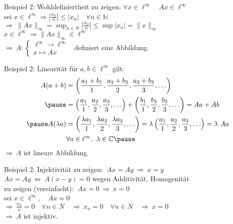 \documentclass[AERbeamer%
,optBeamerClassicFormat%
,optLeftEquations   %
]{AERlatex}
\begin{document}
%
    \begin{frame}{Beispiel 2: Wohldefiniertheit}
        \setlength{\baselineskip}{1.6\baselineskip}
        zu zeigen: $\forall x \in \ell^{\infty} \quad A x \in \ell^{\infty}$ \\ \pause
        sei $x \in \ell^{\infty} \Rightarrow\left|\frac{x_n}{n}\right| \leq\left|x_n\right| \quad \forall n \in \mathbb{N}$ \\ \pause
        $\Rightarrow ~ \|A x\|_{\infty}=\sup _{n \in N}\left|\frac{x_n}{n}\right| \leq \sup \left|x_n\right|=\|x\|_{\infty}$ \\ \pause
        $x \in \ell^{\infty} \Rightarrow\|A x\|_{\infty} \in \ell^{\infty}$ \\ \pause
        \vspace{1em}
        $\Rightarrow ~ A:\left\{\begin{array}{l}
                                    \ell^{\infty} \rightarrow \ell^{\infty} \\ x \mapsto A x
        \end{array} \right.~$ definiert eine Abbildung.
    \end{frame}
%
    \begin{frame}{Beispiel 2: Linearität}
        \setlength{\baselineskip}{1.6\baselineskip}
        für $a, b \in \ell^{\infty}$ gilt:
        \begin{equation*}
            \begin{aligned}
                A(a+b)&=\left(\frac{a_1+b_1}{1}, \frac{a_2+b_2}{2}, \frac{a_3+b_3}{3}, \ldots\right) \\ \pause
                &=\left(\frac{a_1}{1}, \frac{a_2}{2}, \frac{a_3}{3}, \ldots\right)+\left(\frac{b_1}{1}, \frac{b_2}{2}, \frac{b_3}{3}, \ldots\right)=A a+A b \\ \pause
                A(\lambda a)&=\left(\frac{\lambda a_1}{1}, \frac{\lambda a_2}{2}, \frac{\lambda a_3}{3}, \ldots\right)=\lambda\left(\frac{a_1}{1}, \frac{a_2}{2}, \frac{a_3}{3}, \ldots\right)=\lambda ~ A a \\ & \forall a \in \ell^{\infty}, ~\lambda \in \mathbb{C} \pause
            \end{aligned}
        \end{equation*}
        $\Rightarrow ~ A$  ist lineare Abbildung.
    \end{frame}
%
    \begin{frame}{Beispiel 2: Injektivität}
        \setlength{\baselineskip}{1.6\baselineskip}
        zu zeigen: $~ A x=A y ~ \Rightarrow ~ x=y$ \\ \pause
        $A x=A y ~ \Leftrightarrow ~ A(x-y)=0$ wegen Additivität, Homogenität \\ \pause
        zu zeigen (vereinfacht): $~ A x=0 ~ \Rightarrow ~ x=0$ \\ \pause
        sei $x \in \ell^{\infty}, \quad A x=0$ \\ \pause
        $\Rightarrow ~ \frac{x_n}{n}=0 \quad \forall n \in N \quad \Rightarrow ~ x_n=0 \quad \forall n \in N \quad \Rightarrow ~ x=0$ \\ \pause
        $\Rightarrow ~ A$ ist injektiv.
    \end{frame}
\end{document}
